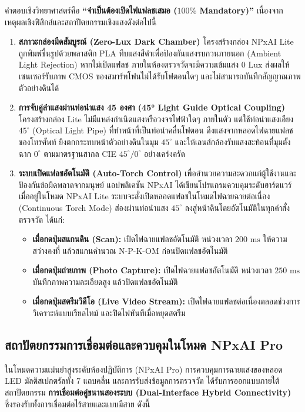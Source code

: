 \documentclass[12pt,a4paper,oneside]{book}
\begin{document}
คำตอบเชิงวิทยาศาสตร์คือ \textbf{``จำเป็นต้องเปิดไฟแฟลชเสมอ ($100\%$ Mandatory)''} เนื่องจากเหตุผลเชิงฟิสิกส์และสถาปัตยกรรมเชิงแสงดังต่อไปนี้
\begin{enumerate}
    \item \textbf{สภาวะกล่องมืดสัมบูรณ์ (Zero-Lux Dark Chamber)}
    โครงสร้างกล่อง NPxAI Lite ถูกพิมพ์ขึ้นรูปด้วยพลาสติก PLA ทึบแสงสีดำเพื่อป้องกันแสงรบกวนภายนอก (Ambient Light Rejection) หากไม่เปิดแฟลช ภายในห้องตรวจวัดจะมีความเข้มแสง $0\text{ Lux}$ ส่งผลให้เซนเซอร์รับภาพ CMOS ของสมาร์ทโฟนไม่ได้รับโฟตอนใดๆ และไม่สามารถบันทึกสัญญาณภาพตัวอย่างดินได้
    
    \item \textbf{การจับคู่ลำแสงผ่านท่อนำแสง 45 องศา (45° Light Guide Optical Coupling)}
    โครงสร้างกล่อง Lite ไม่มีแหล่งกำเนิดแสงหรือวงจรไฟฟ้าใดๆ ภายในตัว แต่ใช้ท่อนำแสงเอียง $45^\circ$ (Optical Light Pipe) ที่ทำหน้าที่เป็นท่อนำคลื่นโฟตอน ดึงแสงจากหลอดไฟฉายแฟลชของโทรศัพท์ ยิงตกกระทบหน้าตัวอย่างดินในมุม $45^\circ$ และให้เลนส์กล้องรับแสงสะท้อนที่มุมตั้งฉาก $0^\circ$ ตามมาตรฐานสากล CIE $45^\circ/0^\circ$ อย่างเคร่งครัด
    
    \item \textbf{ระบบเปิดแฟลชอัตโนมัติ (Auto-Torch Control)}
    เพื่ออำนวยความสะดวกแก่ผู้ใช้งานและป้องกันข้อผิดพลาดจากมนุษย์ แอปพลิเคชัน NPxAI ได้เขียนโปรแกรมควบคุมระดับฮาร์ดแวร์ เมื่ออยู่ในโหมด NPxAI Lite ระบบจะสั่งเปิดหลอดแฟลชในโหมดไฟฉายฉายต่อเนื่อง (Continuous Torch Mode) ส่องผ่านท่อนำแสง $45^\circ$ ลงสู่หน้าดินโดยอัตโนมัติในทุกคำสั่งตรวจวัด ได้แก่:
    \begin{itemize}
        \item \textbf{เมื่อกดปุ่มสแกนดิน (Scan):} เปิดไฟฉายแฟลชอัตโนมัติ หน่วงเวลา $200\text{ ms}$ ให้ความสว่างคงที่ แล้วสแกนคำนวณ N-P-K-OM ก่อนปิดแฟลชอัตโนมัติ
        \item \textbf{เมื่อกดปุ่มถ่ายภาพ (Photo Capture):} เปิดไฟฉายแฟลชอัตโนมัติ หน่วงเวลา $250\text{ ms}$ บันทึกภาพความละเอียดสูง แล้วปิดแฟลชอัตโนมัติ
        \item \textbf{เมื่อกดปุ่มสตรีมวิดีโอ (Live Video Stream):} เปิดไฟฉายแฟลชต่อเนื่องตลอดช่วงการวิเคราะห์แบบเรียลไทม์ และปิดไฟทันทีเมื่อหยุดสตรีม
    \end{itemize}
\end{enumerate}

\subsection{สถาปัตยกรรมการเชื่อมต่อและควบคุมในโหมด NPxAI Pro}
ในโหมดความแม่นยำสูงระดับห้องปฏิบัติการ (NPxAI Pro) การควบคุมการฉายแสงของหลอด LED มัลติสเปกตรัลทั้ง 7 แถบคลื่น และการรับส่งข้อมูลการตรวจวัด ได้รับการออกแบบภายใต้สถาปัตยกรรม \textbf{การเชื่อมต่อคู่ขนานสองระบบ (Dual-Interface Hybrid Connectivity)} ซึ่งรองรับทั้งการเชื่อมต่อไร้สายและแบบมีสาย ดังนี้
\end{document}
